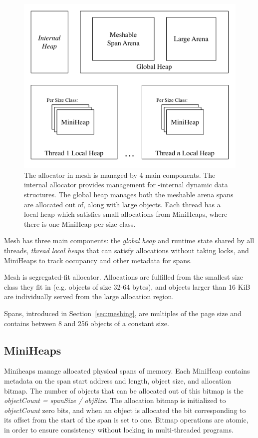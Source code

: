 \begin{figure}
  \includegraphics[width=.5\textwidth]{figures/global_heap}
  \caption{The allocator in mesh is managed by 4 main components.  The
    internal allocator provides management for \Mesh-internal dynamic
    data structures.  The global heap manages both the meshable arena
    spans are allocated out of, along with large objects.  Each thread
    has a local heap which satisfies small allocations from MiniHeaps,
    where there is one MiniHeap per size class.}
  \label{fig:global-heap}
\end{figure}

Mesh has three main components: the \textit{global heap} and runtime
state shared by all threads, \textit{thread local heaps} that can
satisfy allocations without taking locks, and MiniHeaps to track
occupancy and other metadata for spans.

Mesh is segregated-fit allocator.  Allocations are fulfilled from the
smallest size class they fit in (e.g. objects of size 32-64 bytes),
and objects larger than 16 KiB are individually served from the large
allocation region.

Spans, introduced in Section~\ref{sec:meshing}, are multiples of the
page size and contains between 8 and 256 objects of a constant size.

\subsection{MiniHeaps}

Miniheaps manage allocated physical spans of memory.  Each MiniHeap
contains metadata on the span start address and length, object size,
and allocation bitmap.  The number of objects that can be allocated
out of this bitmap is the \textit{objectCount = spanSize / objSize}.
The allocation bitmap is initialized to \textit{objectCount} zero
bits, and when an object is allocated the bit corresponding to its
offset from the start of the span is set to one.  Bitmap operations
are atomic, in order to ensure consistency without locking in
multi-threaded programs.

